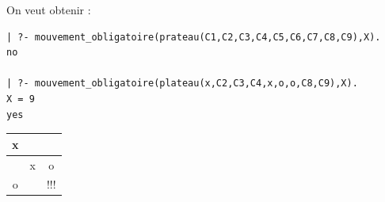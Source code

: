 \documentclass[a4paper]{article}
\newenvironment{CAnswer}{\color{red}\begin{Answer}}
                        {\end{Answer}}
\begin{document}
\begin{Exercise}[title={Tic-Tac-Toe }]
On veut obtenir :
\begin{verbatim}
| ?- mouvement_obligatoire(prateau(C1,C2,C3,C4,C5,C6,C7,C8,C9),X). 
no 

| ?- mouvement_obligatoire(plateau(x,C2,C3,C4,x,o,o,C8,C9),X).    
X = 9 
yes 
\end{verbatim}
\begin{center}
\begin{tabular}{|c|c|c|}\hline
 x &   &   \\\hline
   & x & o \\\hline
 o &   & !!! \\\hline
\end{tabular}
\end{center}
\end{Exercise}
\begin{CAnswer}

\end{CAnswer}
\end{document}
